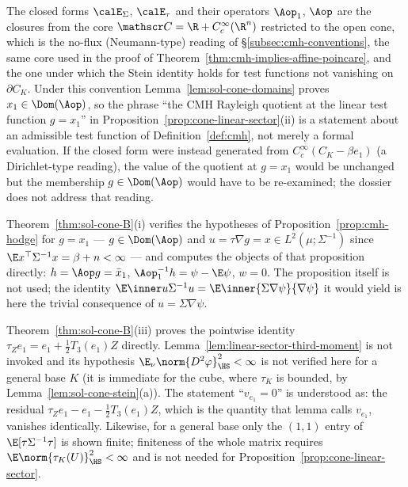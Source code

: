 \documentclass[../main.tex]{subfiles}
\begin{document}
\begin{remark}
\label{rem:sol-cone-conventions}
The closed forms $\calE_\Sigma$, $\calE_\tau$ and their operators $\Aop_1$, $\Aop$ are the
closures from the core $\mathscr C=\R+C_c^\infty(\R^n)$ restricted to the open cone, which is
the no-flux (Neumann-type) reading of \S\ref{subsec:cmh-conventions}, the same core used in
the proof of Theorem~\ref{thm:cmh-implies-affine-poincare}, and the one under which the Stein
identity holds for test functions not vanishing on $\partial C_K$.  Under this convention
Lemma~\ref{lem:sol-cone-domains} proves $x_1\in\Dom(\Aop)$, so the phrase ``the CMH Rayleigh
quotient at the linear test function $g=x_1$'' in Proposition~\ref{prop:cone-linear-sector}(ii)
is a statement about an admissible test function of Definition~\ref{def:cmh}, not merely a
formal evaluation.  If the closed form were instead generated from $C_c^\infty(C_K-\beta e_1)$
(a Dirichlet-type reading), the value of the quotient at $g=x_1$ would be unchanged but the
membership $g\in\Dom(\Aop)$ would have to be re-examined; the dossier does not address that
reading.
\end{remark}

\begin{remark}
\label{rem:sol-cone-hodge}
Theorem~\ref{thm:sol-cone-B}(i) verifies the hypotheses of Proposition~\ref{prop:cmh-hodge}
for $g=x_1$ --- $g\in\Dom(\Aop)$ and $u=\tau\nabla g=x\in L^2(\mu;\Sigma^{-1})$ since
$\E x^\top\Sigma^{-1}x=\beta+n<\infty$ --- and computes the objects of that proposition directly:
$h=\Aop g=\bar x_1$, $\Aop_1^{-1}h=\psi-\E\psi$, $w=0$.  The proposition itself is not used;
the identity $\E\inner u{\Sigma^{-1}u}=\E\inner{\Sigma\nabla\psi}{\nabla\psi}$ it would yield
is here the trivial consequence of $u=\Sigma\nabla\psi$.
\end{remark}

\begin{remark}
\label{rem:sol-cone-third}
Theorem~\ref{thm:sol-cone-B}(iii) proves the pointwise identity
$\tau_Ze_1=e_1+\tfrac12T_3(e_1)Z$ directly.  Lemma~\ref{lem:linear-sector-third-moment} is not
invoked and its hypothesis $\E_\nu\norm{D^2\varphi}_{\HS}^2<\infty$ is not verified here for a
general base $K$ (it is immediate for the cube, where $\tau_K$ is bounded, by
Lemma~\ref{lem:sol-cone-stein}(a)).  The statement ``$v_{e_1}=0$'' is understood as: the
residual $\tau_Ze_1-e_1-\tfrac12T_3(e_1)Z$, which is the quantity that lemma calls $v_{e_1}$,
vanishes identically.  Likewise, for a general base only the $(1,1)$ entry of
$\E[\tau\Sigma^{-1}\tau]$ is shown finite; finiteness of the whole matrix requires
$\E\norm{\tau_K(U)}_{\HS}^2<\infty$ and is not needed for Proposition~\ref{prop:cone-linear-sector}.
\end{remark}
\end{document}
